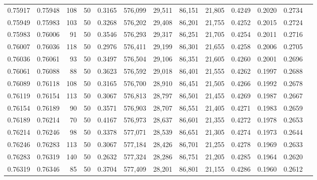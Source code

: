 \begin{tabular}{rrrrrrrrrrrrr}
0.75917 & 0.75948 &   108 &  50 &                                     0.3165 & 576,099 &  29,511 &  86,151 &  21,805 & 0.4249 & 0.2020 & 0.2734 \\
0.75949 & 0.75983 &   103 &  50 &                                     0.3268 & 576,202 &  29,408 &  86,201 &  21,755 & 0.4252 & 0.2015 & 0.2724 \\
0.75983 & 0.76006 &    91 &  50 &                                     0.3546 & 576,293 &  29,317 &  86,251 &  21,705 & 0.4254 & 0.2011 & 0.2716 \\
0.76007 & 0.76036 &   118 &  50 &                                     0.2976 & 576,411 &  29,199 &  86,301 &  21,655 & 0.4258 & 0.2006 & 0.2705 \\
0.76036 & 0.76061 &    93 &  50 &                                     0.3497 & 576,504 &  29,106 &  86,351 &  21,605 & 0.4260 & 0.2001 & 0.2696 \\
0.76061 & 0.76088 &    88 &  50 &                                     0.3623 & 576,592 &  29,018 &  86,401 &  21,555 & 0.4262 & 0.1997 & 0.2688 \\
0.76089 & 0.76118 &   108 &  50 &                                     0.3165 & 576,700 &  28,910 &  86,451 &  21,505 & 0.4266 & 0.1992 & 0.2678 \\
0.76119 & 0.76154 &   113 &  50 &                                     0.3067 & 576,813 &  28,797 &  86,501 &  21,455 & 0.4269 & 0.1987 & 0.2667 \\
0.76154 & 0.76189 &    90 &  50 &                                     0.3571 & 576,903 &  28,707 &  86,551 &  21,405 & 0.4271 & 0.1983 & 0.2659 \\
0.76189 & 0.76214 &    70 &  50 &                                     0.4167 & 576,973 &  28,637 &  86,601 &  21,355 & 0.4272 & 0.1978 & 0.2653 \\
0.76214 & 0.76246 &    98 &  50 &                                     0.3378 & 577,071 &  28,539 &  86,651 &  21,305 & 0.4274 & 0.1973 & 0.2644 \\
0.76246 & 0.76283 &   113 &  50 &                                     0.3067 & 577,184 &  28,426 &  86,701 &  21,255 & 0.4278 & 0.1969 & 0.2633 \\
0.76283 & 0.76319 &   140 &  50 &                                     0.2632 & 577,324 &  28,286 &  86,751 &  21,205 & 0.4285 & 0.1964 & 0.2620 \\
0.76319 & 0.76346 &    85 &  50 &                                     0.3704 & 577,409 &  28,201 &  86,801 &  21,155 & 0.4286 & 0.1960 & 0.2612 \\

\end{tabular}

